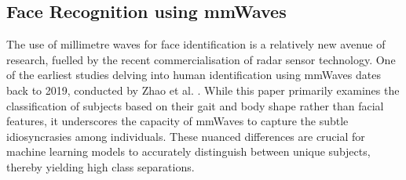 \documentclass{mpaper}
\begin{document}
\subsection{Face Recognition using mmWaves}
The use of millimetre waves for face identification is a relatively new avenue of research, fuelled by the recent commercialisation of radar sensor technology. One of the earliest studies delving into human identification using mmWaves dates back to 2019, conducted by Zhao et al. \cite{zhao2019mid}. While this paper primarily examines the classification of subjects based on their gait and body shape rather than facial features, it underscores the capacity of mmWaves to capture the subtle idiosyncrasies among individuals. These nuanced differences are crucial for machine learning models to accurately distinguish between unique subjects, thereby yielding high class separations.
\end{document}
